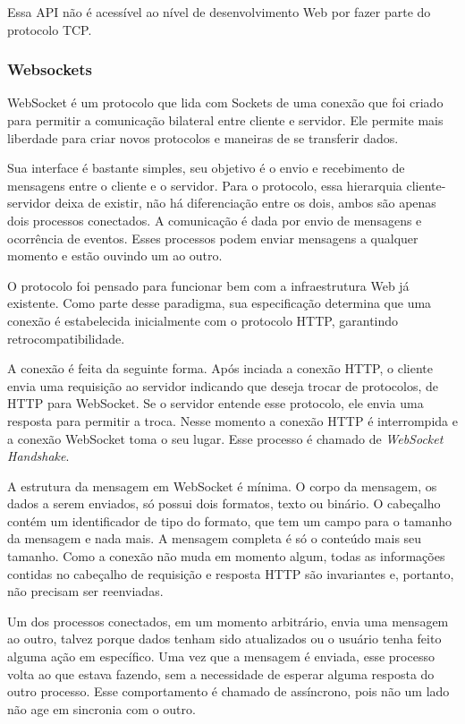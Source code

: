 \documentclass[a4paper,12pt]{article}
\begin{document}
Essa API não é acessível ao nível de desenvolvimento Web por fazer parte do protocolo TCP.


\subsubsection{Websockets}

WebSocket é um protocolo que lida com Sockets de uma conexão que foi criado para permitir a comunicação bilateral entre cliente e servidor. Ele permite mais liberdade para criar novos protocolos e maneiras de se transferir dados.

Sua interface é bastante simples, seu objetivo é o envio e recebimento de mensagens entre o cliente e o servidor. Para o protocolo, essa hierarquia cliente-servidor deixa de existir, não há diferenciação entre os dois, ambos são apenas dois processos conectados. A comunicação é dada por envio de mensagens e ocorrência de eventos. Esses processos podem enviar mensagens a qualquer momento e estão ouvindo um ao outro.

O protocolo foi pensado para funcionar bem com a infraestrutura Web já existente. Como parte desse paradigma, sua especificação determina que uma conexão é estabelecida inicialmente com o protocolo HTTP, garantindo retrocompatibilidade.

A conexão é feita da seguinte forma. Após inciada a conexão HTTP, o cliente envia uma requisição ao servidor indicando que deseja trocar de protocolos, de HTTP para WebSocket. Se o servidor entende esse protocolo, ele envia uma resposta para permitir a troca. Nesse momento a conexão HTTP é interrompida e a conexão WebSocket toma o seu lugar. Esse processo é chamado de \emph{WebSocket Handshake}.

A estrutura da mensagem em WebSocket é mínima. O corpo da mensagem, os dados a serem enviados, só possui dois formatos, texto ou binário. O cabeçalho contém um identificador de tipo do formato, que tem um campo para o tamanho da mensagem e nada mais. A mensagem completa é só o conteúdo mais seu tamanho. Como a conexão não muda em momento algum, todas as informações contidas no cabeçalho de requisição e resposta HTTP são invariantes e, portanto, não precisam ser reenviadas.

Um dos processos conectados, em um momento arbitrário, envia uma mensagem ao outro, talvez porque dados tenham sido atualizados ou o usuário tenha feito alguma ação em específico. Uma vez que a mensagem é enviada, esse processo volta ao que estava fazendo, sem a necessidade de esperar alguma resposta do outro processo. Esse comportamento é chamado de assíncrono, pois não um lado não age em sincronia com o outro.
\end{document}
